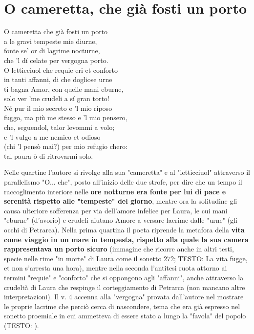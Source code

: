 \documentclass[10pt,a4paper]{article}
\begin{document}
\section{O cameretta, che già fosti un porto}

\begin{estratto}
	O cameretta che già fosti un porto\\
	a le gravi tempeste mie diurne,\\
	fonte se’ or di lagrime nocturne,\\
	che ’l dí celate per vergogna porto.\\
	
	O letticciuol che requie eri et conforto\\
	in tanti affanni, di che dogliose urne\\
	ti bagna Amor, con quelle mani eburne,\\
	solo ver ’me crudeli a sí gran torto!\\
	
	Né pur il mio secreto e ’l mio riposo\\
	fuggo, ma più me stesso e ’l mio pensero,\\
	che, seguendol, talor levommi a volo;\\
	
	e ’l vulgo a me nemico et odioso\\
	(chi ’l pensò mai?) per mio refugio chero:\\
	tal paura ò di ritrovarmi solo.\\
\end{estratto}

Nelle quartine l'autore si rivolge alla sua "cameretta" e al "letticciuol" attraverso il parallelismo "O... che", posto all'inizio delle due strofe, per dire che un tempo il raccoglimento interiore nelle \textbf{ore notturne era fonte per lui di pace e serenità rispetto alle "tempeste" del giorno}, mentre ora la solitudine gli causa ulteriore sofferenza per via dell'amore infelice per Laura, le cui mani "eburne" (d'avorio) e crudeli aiutano Amore a versare lacrime dalle "urne" (gli occhi di Petrarca). Nella prima quartina il poeta riprende la metafora della \textbf{vita come viaggio in un mare in tempesta, rispetto alla quale la sua camera rappresentava un porto sicuro} (immagine che ricorre anche in altri testi, specie nelle rime "in morte" di Laura come il sonetto 272; TESTO: La vita fugge, et non s'arresta una hora), mentre nella seconda l'antitesi ruota attorno ai termini "requie" e "conforto" che si oppongono agli "affanni", anche attraverso la crudeltà di Laura che respinge il corteggiamento di Petrarca (non mancano altre interpretazioni). Il v. 4 accenna alla "vergogna" provata dall'autore nel mostrare le proprie lacrime che perciò cerca di nascondere, tema che era già espresso nel sonetto proemiale in cui ammetteva di essere stato a lungo la "favola" del popolo (TESTO: ).
\end{document}
